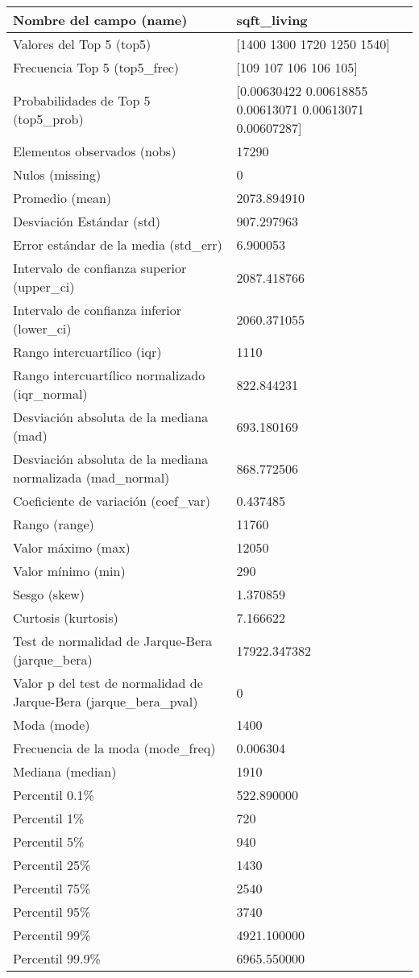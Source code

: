 \begin{longtable}{|m{10em}|m{25em}|}
    \hline
    Nombre del campo (name) & sqft\_living \\ \hline
    Valores del Top 5 (top5) & [1400 1300 1720 1250 1540] \\ \hline
    Frecuencia Top 5 (top5\_frec) & [109 107 106 106 105] \\ \hline
    Probabilidades de Top 5 (top5\_prob) & [0.00630422 0.00618855 0.00613071 0.00613071 0.00607287] \\ \hline
    Elementos observados (nobs) & 17290 \\ \hline
    Nulos (missing) & 0 \\ \hline
    Promedio (mean) & 2073.894910 \\ \hline
    Desviación Estándar (std) & 907.297963 \\ \hline
    Error estándar de la media (std\_err) & 6.900053 \\ \hline
    Intervalo de confianza superior (upper\_ci) & 2087.418766 \\ \hline
    Intervalo de confianza inferior (lower\_ci) & 2060.371055 \\ \hline
    Rango intercuartílico (iqr) & 1110 \\ \hline
    Rango intercuartílico normalizado (iqr\_normal) & 822.844231 \\ \hline
    Desviación absoluta de la mediana (mad) & 693.180169 \\ \hline
    Desviación absoluta de la mediana normalizada (mad\_normal) & 868.772506 \\ \hline
    Coeficiente de variación (coef\_var) & 0.437485 \\ \hline
    Rango (range) & 11760 \\ \hline
    Valor máximo (max) & 12050 \\ \hline
    Valor mínimo (min) & 290 \\ \hline
    Sesgo (skew) & 1.370859 \\ \hline
    Curtosis (kurtosis) & 7.166622 \\ \hline
    Test de normalidad de Jarque-Bera (jarque\_bera) & 17922.347382 \\ \hline
    Valor p del test de normalidad de Jarque-Bera (jarque\_bera\_pval) & 0 \\ \hline
    Moda (mode) & 1400 \\ \hline
    Frecuencia de la moda (mode\_freq) & 0.006304 \\ \hline
    Mediana (median) & 1910 \\ \hline
    Percentil 0.1\% & 522.890000 \\ \hline
    Percentil 1\% & 720 \\ \hline
    Percentil 5\% & 940 \\ \hline
    Percentil 25\% & 1430 \\ \hline
    Percentil 75\% & 2540 \\ \hline
    Percentil 95\% & 3740 \\ \hline
    Percentil 99\% & 4921.100000 \\ \hline
    Percentil 99.9\% & 6965.550000 \\ \hline
\end{longtable}

